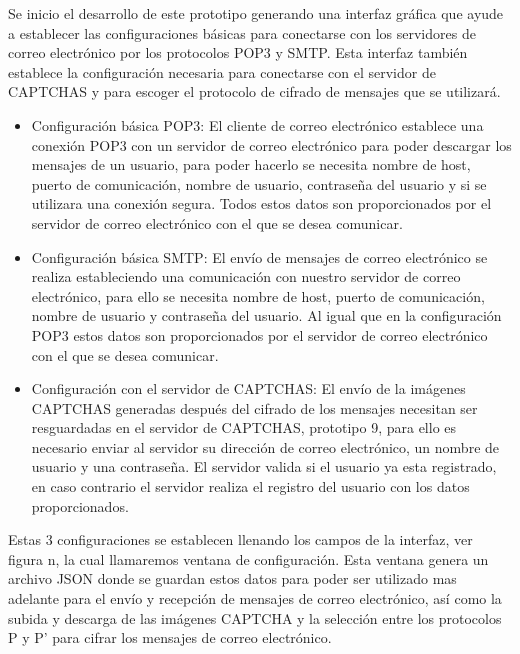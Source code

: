 Se inicio el desarrollo de este prototipo generando una interfaz gráfica que ayude a establecer las configuraciones básicas para conectarse con los servidores de correo electrónico por los protocolos POP3 y SMTP. Esta interfaz también establece la configuración necesaria para conectarse con el servidor de CAPTCHAS y para escoger el protocolo de cifrado de mensajes que se utilizará.
\begin{itemize}
 \item Configuración básica POP3: El cliente de correo electrónico establece una conexión POP3 con un servidor de correo electrónico para poder descargar los mensajes de un usuario, para poder hacerlo se necesita nombre de host, puerto de comunicación, nombre de usuario, contraseña del usuario y si se utilizara una conexión segura. Todos estos datos son proporcionados por el servidor de correo electrónico con el que se desea comunicar.
 \item Configuración básica SMTP: El envío de mensajes de correo electrónico se realiza estableciendo una comunicación con nuestro servidor de correo electrónico, para ello se necesita nombre de host, puerto de comunicación, nombre de usuario y contraseña del usuario. Al igual que en la configuración POP3 estos datos son proporcionados por el servidor de correo electrónico con el que se desea comunicar.
 \item Configuración con el servidor de CAPTCHAS: El envío de la imágenes CAPTCHAS generadas después del cifrado de los mensajes necesitan ser resguardadas en el servidor de CAPTCHAS, prototipo 9, para ello es necesario enviar al servidor su dirección de correo electrónico, un nombre de usuario y una contraseña. El servidor valida si el usuario ya esta registrado, en caso contrario el servidor realiza el registro del usuario con los datos proporcionados.
\end{itemize}
Estas 3 configuraciones se establecen llenando los campos de la interfaz, ver figura n, la cual llamaremos ventana de configuración. Esta ventana genera un archivo JSON donde se guardan estos datos para poder ser utilizado mas adelante para el envío y recepción de mensajes de correo electrónico, así como la subida y descarga de las imágenes CAPTCHA y la selección entre los protocolos P y P’ para cifrar los mensajes de correo electrónico.

